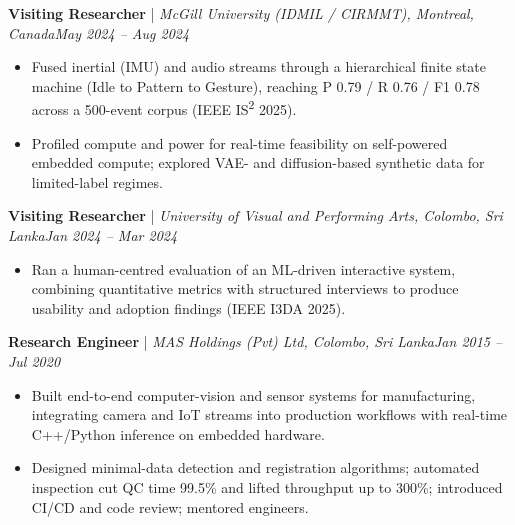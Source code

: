 \documentclass[11pt]{article}
\newenvironment{cvrole}[5]{%
  \par\noindent\textbf{\large #1} | \textit{\small #2, #3}\hfill \textit{\small #4 -- #5}\par
  \begin{itemize}[leftmargin=2em, itemsep=-0.3em, topsep=-0.5em]%
}{%
  \end{itemize}\par\noindent\mbox{}\par\vspace{0.1em}%
}
\begin{document}
\begin{cvrole}{Visiting Researcher}{McGill University (IDMIL / CIRMMT)}{Montreal, Canada}{May 2024}{Aug 2024}
    \item Fused inertial (IMU) and audio streams through a hierarchical finite state machine (Idle to Pattern to Gesture), reaching P 0.79 / R 0.76 / F1 0.78 across a 500-event corpus (IEEE IS\textsuperscript{2} 2025).
    \item Profiled compute and power for real-time feasibility on self-powered embedded compute; explored VAE- and diffusion-based synthetic data for limited-label regimes.
\end{cvrole}

\begin{cvrole}{Visiting Researcher}{University of Visual and Performing Arts}{Colombo, Sri Lanka}{Jan 2024}{Mar 2024}
    \item Ran a human-centred evaluation of an ML-driven interactive system, combining quantitative metrics with structured interviews to produce usability and adoption findings (IEEE I3DA 2025).
\end{cvrole}

\begin{cvrole}{Research Engineer}{MAS Holdings (Pvt) Ltd}{Colombo, Sri Lanka}{Jan 2015}{Jul 2020}
    \item Built end-to-end computer-vision and sensor systems for manufacturing, integrating camera and IoT streams into production workflows with real-time C++/Python inference on embedded hardware.
    \item Designed minimal-data detection and registration algorithms; automated inspection cut QC time 99.5\% and lifted throughput up to 300\%; introduced CI/CD and code review; mentored engineers.
\end{cvrole}

\enlargethispage{4\baselineskip}
\end{document}

